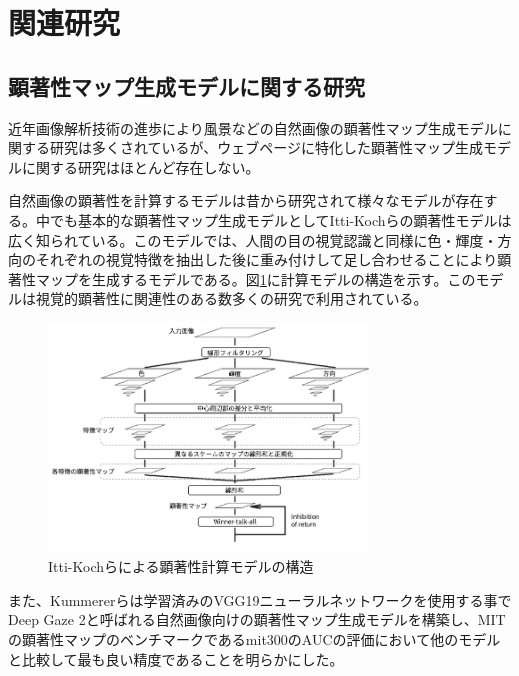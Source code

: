 \newpage
\renewcommand{\baselinestretch}{1.5}
\section{関連研究}
\renewcommand{\baselinestretch}{1}

\subsection{顕著性マップ生成モデルに関する研究}\label{subsec:itti-kochi}
\par 近年画像解析技術の進歩により風景などの自然画像の顕著性マップ生成モデルに関する研究は多くされているが、ウェブページに特化した顕著性マップ生成モデルに関する研究はほとんど存在しない。

\par 自然画像の顕著性を計算するモデルは昔から研究されて様々なモデルが存在する。中でも基本的な顕著性マップ生成モデルとしてItti-Kochらの顕著性モデル\cite{itti1998model}は広く知られている。このモデルでは、人間の目の視覚認識と同様に色・輝度・方向のそれぞれの視覚特徴を抽出した後に重み付けして足し合わせることにより顕著性マップを生成するモデルである。図\ref{fig_itti-kochi}に計算モデルの構造を示す。このモデルは視覚的顕著性に関連性のある数多くの研究で利用されている。

\begin{figure}[H]
    \centering
    \includegraphics[width=8.5cm]{figures/itti-kochi-model.jpg}
    \caption{Itti-Kochらによる顕著性計算モデルの構造\cite{itti1998model}\label{subsec:itti-kochi}}
    \label{fig_itti-kochi}
\end{figure}

\par また、Kummererらは学習済みのVGG19ニューラルネットワークを使用する事でDeep Gaze 2と呼ばれる自然画像向けの顕著性マップ生成モデルを構築し、MITの顕著性マップのベンチマークであるmit300\cite{mit-saliency-benchmark}のAUCの評価において他のモデルと比較して最も良い精度であることを明らかにした\cite{kummerer2016deepgaze}。

